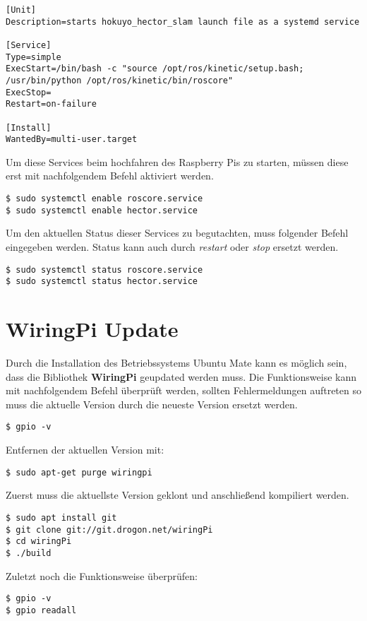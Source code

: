 \begin{lstlisting}
[Unit]
Description=starts hokuyo_hector_slam launch file as a systemd service

[Service]
Type=simple
ExecStart=/bin/bash -c "source /opt/ros/kinetic/setup.bash; /usr/bin/python /opt/ros/kinetic/bin/roscore"
ExecStop=
Restart=on-failure

[Install]
WantedBy=multi-user.target
\end{lstlisting}

Um diese Services beim hochfahren des Raspberry Pis zu starten, müssen diese erst mit nachfolgendem Befehl aktiviert werden.\\

\begin{lstlisting}
$ sudo systemctl enable roscore.service
$ sudo systemctl enable hector.service
\end{lstlisting}

Um den aktuellen Status dieser Services zu begutachten, muss folgender Befehl eingegeben werden. Status kann auch durch \textit{restart} oder \textit{stop} ersetzt werden.\\ 

\begin{lstlisting}
$ sudo systemctl status roscore.service
$ sudo systemctl status hector.service
\end{lstlisting}

\section{WiringPi Update}

Durch die Installation des Betriebssystems Ubuntu Mate kann es möglich sein, dass die Bibliothek \textbf{WiringPi} geupdated werden muss. Die Funktionsweise kann mit nachfolgendem Befehl überprüft werden, sollten Fehlermeldungen auftreten so muss die aktuelle Version durch die neueste Version ersetzt werden.\\

\begin{lstlisting}
$ gpio -v
\end{lstlisting}

Entfernen der aktuellen Version mit:\\

\begin{lstlisting}
$ sudo apt-get purge wiringpi
\end{lstlisting}

Zuerst muss die aktuellste Version geklont und anschließend kompiliert werden.\\

\begin{lstlisting}
$ sudo apt install git
$ git clone git://git.drogon.net/wiringPi
$ cd wiringPi
$ ./build
\end{lstlisting}

Zuletzt noch die Funktionsweise überprüfen:\\

\begin{lstlisting}
$ gpio -v 
$ gpio readall
\end{lstlisting}
